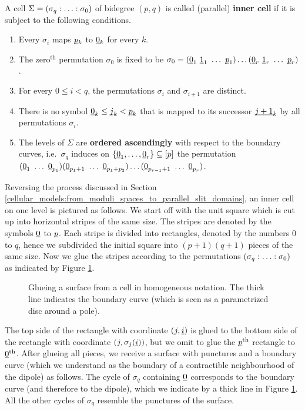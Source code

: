 \begin{defi}
    \label{cellular_models:parallel:inner_cells}
    A cell $\Sigma = \homogq$ of bidegree $(p,q)$ is called (parallel) {\bf inner cell} if it is subject to the following conditions.
    \begin{enumerate}
        \item Every $\sigma_i$ maps $\underline{\smash{p}}_k$ to $\underline{\smash{0}}_k$ for every $k$.
        \item The zero${}^{\text{th}}$ permutation $\sigma_0$ is fixed to be $\sigma_0 = (\ul 0_1\ \ul 1_1\ \ldots\ \ul p_1)\ldots (\ul 0_r\ \ul 1_r\ \ldots\ \ul p_r)$.
        \item For every $0 \le i < q$, the permutations $\sigma_i$ and $\sigma_{i+1}$ are distinct.
        \item There is no symbol $\underline{\smash{0}}_k \le \underline{\smash{j}}_k < \underline{\smash{p}}_k$ that is mapped to its successor $\underline{\smash{j+1}}_k$ by all permutations $\sigma_i$.
        \item The levels of $\Sigma$ are {\bf ordered ascendingly} with respect to the boundary curves,
            i.e.\ $\sigma_q$ induces on $\{\ul0_1, \ldots, \ul0_r\} \subseteq [p]$ the permutation
            $(\ul0_1\ \ldots\ \ul0_{p_1})(\ul0_{p_1 + 1} \ \ldots\ \ul0_{p_1+p_2}) \ldots (\ul0_{p_{r-1} + 1} \ \ldots\ \ul0_{p_r})$.
    \end{enumerate}
\end{defi}

Reversing the process discussed in Section \ref{cellular_models:from_moduli_spaces_to_parallel_slit_domains}, an inner cell on one level is pictured as follows.
We start off with the unit square which is cut up into horizontal stripes of the same size.
The stripes are denoted by the symbols $\underline{\smash{0}}$ to $\underline{\smash{p}}$.
Each stripe is divided into rectangles, denoted by the numbers $0$ to $q$,
hence we subdivided the initial square into $(p+1)(q+1)$ pieces of the same size.
Now we glue the stripes according to the permutations $\homogq$ as indicated by Figure \ref{cellular_models:parallel:homogeneous_glueing}.
\begin{figure}[ht]
\centering
{}
\caption{\label{cellular_models:parallel:homogeneous_glueing}Glueing a surface from a cell in homogeneous notation.
    The thick line indicates the boundary curve (which is seen as a parametrized disc around a pole).}
\end{figure}
The top side of the rectangle with coordinate $(j,\underline{\smash{i}})$ is glued to the bottom side of the rectangle with coordinate $(j, \sigma_j(\underline{\smash{i}}))$, but we omit to glue the $\underline{\smash{p}}^{\text{th}}$ rectangle to $\underline{\smash{0}}^{\text{th}}$.
After glueing all pieces, we receive a surface with punctures and a boundary curve (which we understand as the boundary of a contractible neighbourhood of the dipole) as follows.
The cycle of $\sigma_q$ containing $\underline{\smash{0}}$ corresponds to the boundary curve (and therefore to the dipole), which we indicate by a thick line in Figure \ref{cellular_models:parallel:homogeneous_glueing}.
All the other cycles of $\sigma_q$ resemble the punctures of the surface.

